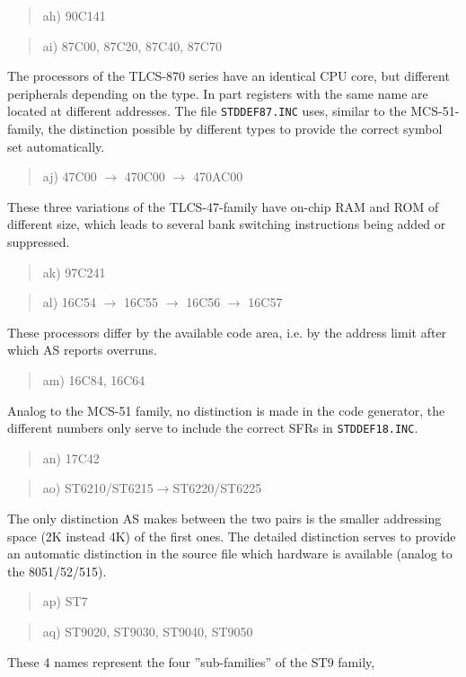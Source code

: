 \documentclass[12pt,twoside]{report}
\newcommand{\tty}[1]{{\tt #1}}
\begin{document}
\begin{quote}
ah) 90C141
\end{quote}
\begin{quote}
ai) 87C00, 87C20, 87C40, 87C70
\end{quote}
The processors of the TLCS-870 series have an identical CPU core, but
different peripherals depending on the type.  In part registers with
the same name are located at different addresses.  The file
\tty{STDDEF87.INC} uses, similar to the MCS-51-family, the distinction
possible by different types to provide the correct symbol set
automatically.
\begin{quote}
aj) 47C00 $\rightarrow$ 470C00 $\rightarrow$ 470AC00
\end{quote}
These three variations of the TLCS-47-family have on-chip RAM and ROM
of different size, which leads to several bank switching instructions 
being added or suppressed.
\begin{quote}
ak) 97C241
\end{quote}
\begin{quote}
al) 16C54 $\rightarrow$ 16C55 $\rightarrow$ 16C56 $\rightarrow$ 16C57
\end{quote}
These processors differ by the available code area, i.e. by the address
limit after which AS reports overruns.
\begin{quote}
am) 16C84, 16C64
\end{quote}
Analog to the MCS-51 family, no distinction is made in the code generator,
the different numbers only serve to include the correct SFRs in
\tty{STDDEF18.INC}.
\begin{quote}
an) 17C42
\end{quote}
\begin{quote}
ao) ST6210/ST6215$\rightarrow$ST6220/ST6225
\end{quote}
The only distinction AS makes between the two pairs is the smaller
addressing space (2K instead 4K) of the first ones.  The detailed
distinction serves to provide an automatic distinction in the source
file which hardware is available (analog to the 8051/52/515).
\begin{quote}
ap) ST7
\end{quote}
\begin{quote}
aq) ST9020, ST9030, ST9040, ST9050
\end{quote}
These 4 names represent the four ''sub-families'' of the ST9 family,
\end{document}
